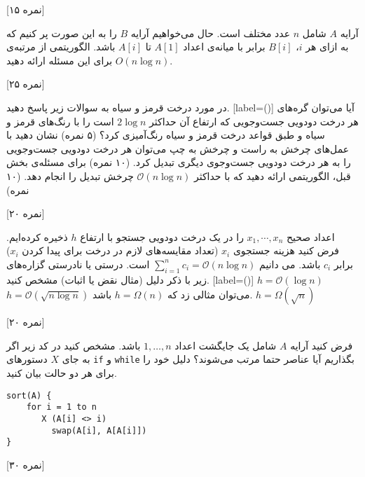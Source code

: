 




\medskip


 [۱۵ نمره]

 آرایه $A$  شامل $n$ عدد مختلف است. حال می‌خواهیم آرایه $B$ را به این صورت پر کنیم که به ازای هر $i$، $B[i]$ برابر با میانه‌ی اعداد $A[1]$  تا $A[i]$  باشد. الگوریتمی از مرتبه‌ی $O(n\log n)$ برای این مسئله ارائه دهید.

[۲۵ نمره]

در مورد درخت قرمز و سیاه به سوالات زیر پاسخ دهید.
[label=(\alph*)]
 آیا می‌توان گره‌های هر درخت دودویی جست‌وجویی که ارتفاع آن حداکثر $2\log{n}$ است را با رنگ‌های قرمز و سیاه و طبق قواعد درخت قرمز و سیاه رنگ‌آمیزی کرد؟ (۵ نمره)
 نشان دهید با عمل‌های چرخش به راست و چرخش به چپ می‌توان هر درخت دودویی جست‌وجویی را به هر درخت دودویی جست‌وجوی دیگری تبدیل کرد. (۱۰ نمره)
 برای مسئله‌ی بخش قبل، الگوریتمی ارائه دهید که با حداکثر 
$\mathcal{O}(n\log{n})$  چرخش تبدیل را انجام دهد. 
(۱۰ نمره)

[۲۰ نمره]


اعداد صحیح $x_1, \cdots, x_n$ را در یک درخت دودویی جستجو با ارتفاع $h$ ذخیره کرده‌ایم. فرض کنید هزینه جستجوی $x_i$ (تعداد مقایسه‌های لازم در درخت برای پیدا کردن $x_i$) برابر $c_i$ باشد. می دانیم $\sum_{i=1}^n c_i = \mathcal{O}(n\log n)$ است. درستی یا نادرستی گزاره‌های زیر با ذکر دلیل (مثال نقض یا اثبات) مشخص کنید.
[label=(\alph*)]
$h=\mathcal{O}(\log n)$
$h = \mathcal{O}(\sqrt{n \log n})$
می‌توان مثالی زد که $h=\Omega(n)$ باشد.
$h = \Omega(\sqrt{n})$



[۲۰ نمره]


فرض کنید آرایه $A$ شامل یک جایگشت اعداد $1,\ldots, n$ باشد. مشخص کنید در کد زیر اگر به جای $X$‌  دستورهای \texttt{if} و \texttt{while} بگذاریم آیا عناصر حتما مرتب می‌شوند؟ دلیل خود را برای هر دو حالت بیان کنید.
\begin{LTR}
\begin{verbatim}
sort(A) {
    for i = 1 to n 
       X (A[i] <> i) 
         swap(A[i], A[A[i]])
}
\end{verbatim}
\end{LTR}


 [۳۰ نمره]

